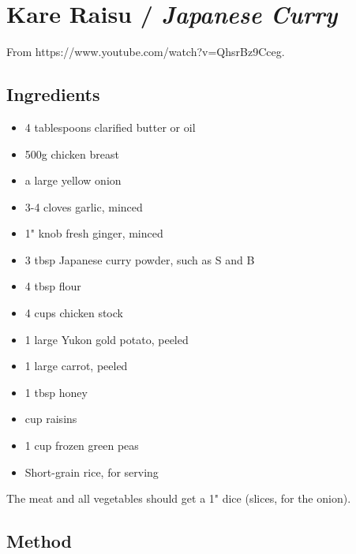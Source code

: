 \clearpage
\section{Kare Raisu / \emph{Japanese Curry}}


From https://www.youtube.com/watch?v=QhsrBz9Cceg.

\subsection{Ingredients}

\begin{itemize}
	\item 4 tablespoons clarified butter or oil
	\item 500g chicken breast
	\item {} a large yellow onion
	\item 3-4 cloves garlic, minced
	\item 1" knob fresh ginger, minced
	\item 3 tbsp Japanese curry powder, such as S and B
	\item 4 tbsp flour
	\item 4 cups chicken stock
	\item 1 large Yukon gold potato, peeled
	\item 1 large carrot, peeled
	\item 1 tbsp honey
	\item {} cup raisins
	\item 1 cup frozen green peas
	\item Short-grain rice, for serving
\end{itemize}

The meat and all vegetables should get a 1" dice (slices, for the onion).

\subsection{Method}

